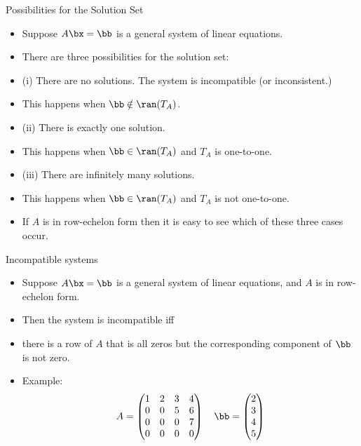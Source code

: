 \documentclass{beamer}
\begin{document}

\begin{frame}{Possibilities for the Solution Set}

\begin{itemize}
\item Suppose $A\bx=\bb$ is a general system of linear equations.
\item There are three possibilities for the solution set:
\item (i) There are no solutions. The system is incompatible (or inconsistent.)
\item This happens when $\bb\notin\ran(T_A)$.
\item (ii) There is exactly one solution.
\item This happens when $\bb\in\ran(T_A)$  and $T_A$ is one-to-one.
\item (iii) There are infinitely many solutions.
\item This happens when $\bb\in\ran(T_A)$  and $T_A$ is not one-to-one.
\item If $A$ is in row-echelon form then it is easy to see which of these three cases occur.
\end{itemize}
\end{frame}


\begin{frame}{Incompatible systems}

\begin{itemize}
\item Suppose $A\bx=\bb$ is a general system of linear equations, and $A$ is in row-echelon form.
\item Then the system is incompatible iff
\item there is a row of $A$ that is all zeros but the corresponding component of $\bb$ is not zero.
\item Example:
$$
A =
\begin{pmatrix}
1 & 2 & 3 & 4 \\
0 & 0 & 5 & 6 \\
0 & 0 & 0 & 7 \\
0 & 0 & 0 & 0 \\
\end{pmatrix}
\quad
\bb=
\begin{pmatrix}
2 \\ 3 \\ 4 \\ 5
\end{pmatrix}
$$

\end{itemize}
\end{frame}
\end{document}
